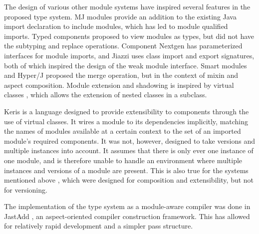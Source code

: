 The design of various other module systems have inspired several features in the 
proposed type system. MJ modules \cite{corwinMJModules} provide an addition to
the existing Java import declaration to include modules, which has led to module
qualified imports. Typed components \cite{secotypedcomponents} proposed to
view modules as types, but did not have the subtyping and replace operations.
Component Nextgen \cite{componentnextgen} has parameterized interfaces for module imports,
and Jiazzi \cite{mcdirmid01jiazzi} uses class import and export signatures, 
both of which inspired the design of the weak module interface. Smart modules
\cite{Ancona05smartmodules} and Hyper/J \cite{hyperj} proposed the merge operation, 
but in the context of mixin and aspect composition. Module extension and shadowing is inspired by 
virtual classes \cite{virtualclasses89}, which allows the extension of nested classes in a subclass.

Keris \cite{keris05} is a language designed to provide extensibility to components
through the use of virtual classes. It wires a module to its dependencies implicitly,
matching the names of modules available at a certain context to the set of an imported
module's required components. It was not, however, designed to take versions and multiple instances
into account. It assumes that there is only ever one instance
of one module, and is therefore unable to handle an environment where multiple instances and versions
of a module are present. This is also true for the systems mentioned above \cite{corwinMJModules, secotypedcomponents, componentnextgen, mcdirmid01jiazzi, Ancona05smartmodules}, which were designed for composition
and extensibility, but not for versioning.

The implementation of the type system as a module-aware compiler was done in JastAdd \cite{jastadd},
an aspect-oriented compiler construction framework. This has allowed for relatively
rapid development and a simpler pass structure.